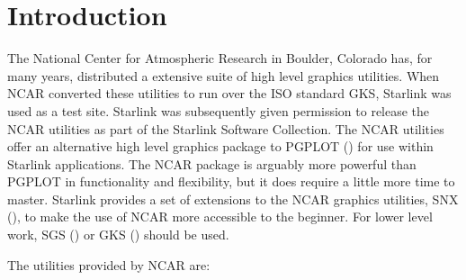 \documentclass[twoside,11pt,nolof,noabs]{starlink}
\begin{document}
\scfrontmatter

\section{Introduction}

The National Center for Atmospheric Research in Boulder, Colorado has,
for many years, distributed a extensive suite of high level graphics
utilities.  When NCAR converted these utilities to run over the ISO
standard GKS, Starlink was used as a test site.  Starlink was
subsequently given permission to release the NCAR utilities as part of
the Starlink Software Collection.  The NCAR utilities offer an
alternative high level graphics package to PGPLOT () 
for use
within Starlink applications.  The NCAR package is arguably more
powerful than PGPLOT in functionality and flexibility, but it does
require a little more time to master.  Starlink provides a set of
extensions to the NCAR graphics utilities, SNX (), to make the
use of NCAR more accessible to the beginner.  For lower level work, SGS
() or GKS () should be used.

The utilities provided by NCAR are:
\end{document}
